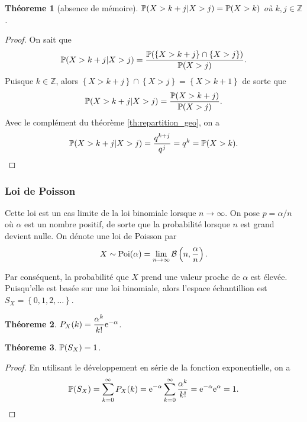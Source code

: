 \documentclass[11pt]{article}
\renewcommand\P{%
	\ensuremath{%
		\mathbb{P}%
	}%
}%
\newcommand\e{%
	\ensuremath{%
		\mathrm{e}%
	}%
}%
\newcommand\bin{%
	\ensuremath{%
		\mathcal{B}%
	}%
}%
\newcommand\poi{%
	\ensuremath{%
		\mathrm{Poi}%
	}%
}%
\newtheorem{theoreme}{Théoreme}[section]
\begin{document}
\begin{theoreme}[absence de mémoire]
	$\P(X>k+j|X>j)=\P(X>k)$ où $k,j\in\mathbb{Z}$.
\end{theoreme}

\begin{proof}
	On sait que
	\begin{equation*}
		\P(X>k+j|X>j)=\frac{\P(
			\left\{X>k+j\right\}\cap
	   		\left\{X>j\right\})}{\P(X>j)}.
	\end{equation*}
	Puisque $k\in\mathbb{Z}$, alors $\left\{X>k+j\right\}\cap\left\{X>j\right\}
	=\left\{X>k+1\right\}$ de sorte que
	\begin{equation*}
		\P(X>k+j|X>j)=\frac{\P(X>k+j)}{\P(X>j)}.
	\end{equation*}
	Avec le complément du théorème \ref{th:repartition_geo}, on a
	\begin{equation*}
		\P(X>k+j|X>j)=\frac{q^{k+j}}{q^{j}}=q^{k}=\P(X>k).
	\end{equation*}
\end{proof}

\subsubsection{Loi de Poisson}
Cette loi est un cas limite de la loi binomiale lorsque $n\rightarrow\infty$.
On pose $p=\alpha/n$ où $\alpha$ est un nombre positif, de sorte que la 
probabilité lorsque $n$ est grand devient nulle. On dénote une loi de Poisson
par
\begin{equation*}
	X\sim\poi(\alpha)
	=\lim_{n\rightarrow\infty}\bin\left(n,\frac{\alpha}{n}\right).
\end{equation*}

Par conséquent, la probabilité que $X$ prend une valeur proche de $\alpha$ est
élevée. Puisqu'elle est basée sur une loi binomiale, alors l'espace
échantillion est $S_X=\left\{0,1,2,\dots\right\}$.

\begin{theoreme}
	$P_X(k)=\dfrac{\alpha^k}{k!}\e^{-\alpha}$.
\end{theoreme}

\begin{theoreme}
	$\P(S_X)=1$.
\end{theoreme}

\begin{proof}
	En utilisant le développement en série de la fonction exponentielle, on a
	\begin{equation*}
		\P(S_X)
		=\sum_{k=0}^\infty P_X(k)
		=\e^{-\alpha}\sum_{k=0}^\infty\frac{\alpha^k}{k!}
		=\e^{-\alpha}\e^\alpha
		=1.
	\end{equation*}
\end{proof}
\end{document}
